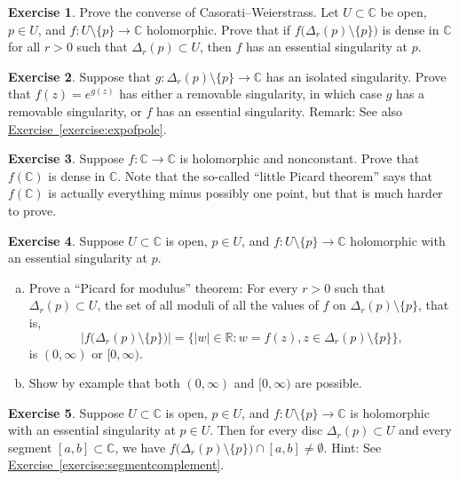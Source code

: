 \documentclass[12pt,openany]{book}
\newcommand{\sabs}[1]{\lvert {#1} \rvert}
\newcommand{\abs}[1]{\left\lvert {#1} \right\rvert}
\newcommand{\C}{{\mathbb{C}}}
\newcommand{\R}{{\mathbb{R}}}
\newcommand{\myquote}[1]{``#1''}
\theoremstyle{plain}
\theoremstyle{remark}
\theoremstyle{definition}
\newenvironment{exbox}{%
    \def\FrameCommand{\vrule width 1pt \relax\hspace{10pt}}%
    \MakeFramed{\advance\hsize-\width\FrameRestore}%
}{%
    \endMakeFramed
}
\newenvironment{exparts}{%
    \leavevmode\begin{enumerate}[a),noitemsep,topsep=0pt,parsep=0pt,partopsep=0pt]
}{%
    \end{enumerate}
}
\theoremstyle{exercise}
\newtheorem{exercise}{Exercise}[section]
\theoremstyle{example}
\newcommand{\exerciseref}[1]{\hyperref[#1]{Exercise~\ref*{#1}}}
\begin{document}
\begin{exbox}
\begin{exercise}
Prove the converse of Casorati--Weierstrass.
Let $U \subset \C$ be open, $p \in U$, and
$f \colon U \setminus \{ p \} \to \C$
holomorphic.
Prove that if $f\bigl(\Delta_r(p) \setminus \{ p \} \bigr)$ is dense in $\C$
for all $r > 0$ such that $\Delta_r(p) \subset U$,
then $f$ has an essential singularity at $p$.
\end{exercise}

\begin{exercise}%
\label{exercise:singofexp}
Suppose that $g \colon \Delta_r(p) \setminus \{ p \} \to \C$
has an isolated singularity.  Prove that $f(z) = e^{g(z)}$
has either a removable singularity, in which case $g$
has a removable singularity, or $f$ has an essential singularity.
Remark: See also \exerciseref{exercise:expofpole}.
\end{exercise}

\begin{exercise}
Suppose $f \colon \C \to \C$ is holomorphic and nonconstant.
Prove that $f(\C)$ is dense in $\C$.
Note that the so-called \myquote{little Picard theorem} says that $f(\C)$
is actually everything minus possibly one point,
but that is much harder to prove.
\end{exercise}

\begin{exercise}
Suppose $U \subset \C$ is open, $p \in U$, and $f \colon U \setminus \{ p \} \to \C$
holomorphic with an essential singularity at $p$.
\begin{exparts}
\item
Prove a \myquote{Picard for modulus} theorem:
For every $r > 0$ such that
$\Delta_r(p) \subset U$, the set
of all moduli of all the values of $f$ on $\Delta_r(p) \setminus \{ p \}$,
that is,
\begin{equation*}
\abs{f\bigl(\Delta_r(p) \setminus \{ p \} \bigr)}
=
\bigl\{ \sabs{w} \in \R : w = f(z), z \in \Delta_r(p) \setminus \{ p \}
\bigr\},
\end{equation*}
is $(0,\infty)$ or $[0,\infty)$.
\item
Show by example that both $(0,\infty)$ and $[0,\infty)$ are possible.
\end{exparts}
\end{exercise}

\begin{exercise}
Suppose $U \subset \C$ is open, $p \in U$, and $f \colon U \setminus \{ p \} \to \C$ is
holomorphic with
an essential singularity at $p \in U$.  Then for every disc
$\Delta_r(p) \subset U$ and every segment $[a,b] \subset
\C$, we have
$f\bigl(\Delta_r(p) \setminus \{ p \} \bigr) \cap [a,b] \not= \emptyset$.
Hint: See 
\exerciseref{exercise:segmentcomplement}.
\end{exercise}
\end{exbox}
\end{document}
